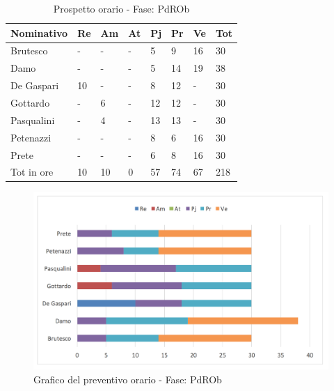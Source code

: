 							\begin{table}[H] \begin{center} \begin{tabular}{llllllll}
							\toprule
							\textbf{Nominativo}	&	\textbf{Re}	&	\textbf{Am}	&	\textbf{At}	&	\textbf{Pj}	&	\textbf{Pr}	&	\textbf{Ve}	&	\textbf{Tot}\\
							\midrule
							Brutesco	&	-	&	-	&	-	&	5	&	9	&	16	&	30	 \\
							Damo	&	-	&	-	&	-	&	5	&	14	&	19	&	38	 \\
							De Gaspari	&	10	&	-	&	-	&	8	&	12	&	-	&	30	 \\
							Gottardo	&	-	&	6	&	-	&	12	&	12	&	-	&	30	 \\
							Pasqualini	&	-	&	4	&	-	&	13	&	13	&	-	&	30	 \\
							Petenazzi	&	-	&	-	&	-	&	8	&	6	&	16	&	30	 \\
							Prete	&	-	&	-	&	-	&	6	&	8	&	16	&	30	 \\
							\midrule
							Tot in ore	&	10	&	10	&	0	&	57	&	74	&	67	&	218	 \\



							\bottomrule
							\end{tabular} \end{center} \caption{Prospetto orario - Fase:
							PdROb
							}\label{tab:h_PdROb} \end{table}		\begin{figure}[H]  \centering  \includegraphics[scale=0.42]{img/h_PdROb}
									\caption{Grafico del preventivo orario - Fase: 								PdROb	}  \label{fig:h_PdROb} \end{figure}

